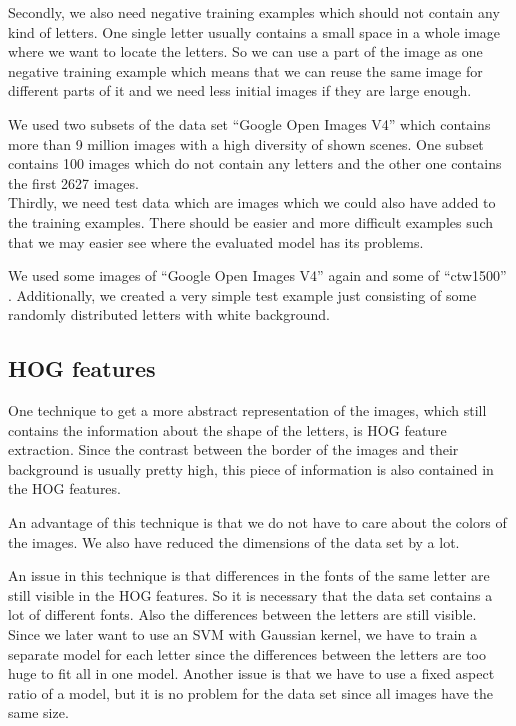 \documentclass[conference]{IEEEtran}
\begin{document}
Secondly, we also need negative training examples which should not contain any kind of letters. One single letter usually contains a small space in a whole image where we want to locate the letters. So we can use a part of the image as one negative training example which means that we can reuse the same image for different parts of it and we need less initial images if they are large enough.

We used two subsets of the data set ``Google Open Images V4'' \cite{bib:openImg} which contains more than 9 million images with a high diversity of shown scenes. One subset contains 100 images which do not contain any letters and the other one contains the first 2627 images. \\[-5pt]

Thirdly, we need test data which are images which we could also have added to the training examples. There should be easier and more difficult examples such that we may easier see where the evaluated model has its problems.

We used some images of ``Google Open Images V4'' \cite{bib:openImg} again and some of ``ctw1500'' \cite{bib:ctw}. Additionally, we created a very simple test example just consisting of some randomly distributed letters with white background.

\subsection{HOG features}\label{sec:hog}

One technique to get a more abstract representation of the images, which still contains the information about the shape of the letters, is HOG feature extraction. Since the contrast between the border of the images and their background is usually pretty high, this piece of information is also contained in the HOG features.

An advantage of this technique is that we do not have to care about the colors of the images. We also have reduced the dimensions of the data set by a lot.

An issue in this technique is that differences in the fonts of the same letter are still visible in the HOG features. So it is necessary that the data set \cite{bib:chars74k} contains a lot of different fonts. Also the differences between the letters are still visible. Since we later want to use an SVM with Gaussian kernel, we have to train a separate model for each letter since the differences  between the letters are too huge to fit all in one model. Another issue is that we have to use a fixed aspect ratio of a model, but it is no problem for the data set \cite{bib:chars74k} since all images have the same size.
\end{document}
